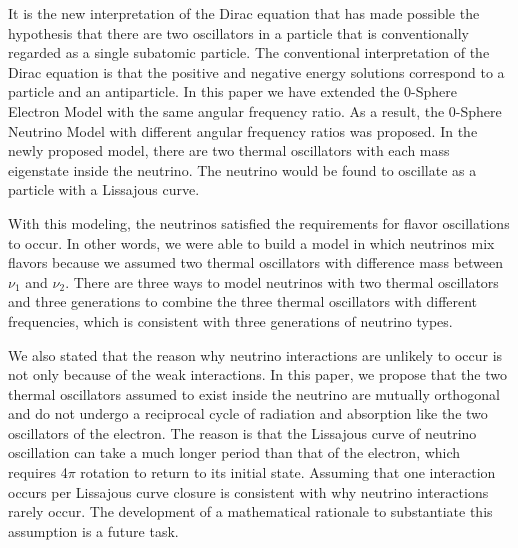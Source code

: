 \documentclass[%
 reprint,
 amsmath,amssymb,
 aps,
]{revtex4-1}
\numberwithin{equation}{section}%
\begin{document}
It is the new interpretation of the Dirac equation that has made possible the hypothesis that there are two oscillators in a particle that is conventionally regarded as a single subatomic particle. The conventional interpretation of the Dirac equation is that the positive and negative energy solutions correspond to a particle and an antiparticle. In this paper we have extended the 0-Sphere Electron Model with the same angular frequency ratio. As a result, the 0-Sphere Neutrino Model with different angular frequency ratios was proposed. In the newly proposed model, there are two thermal oscillators with each mass eigenstate inside the neutrino. The neutrino would be found to oscillate as a particle with a Lissajous curve.




With this modeling, the neutrinos satisfied the requirements for flavor oscillations to occur. In other words, we were able to build a model in which neutrinos mix flavors because we assumed two thermal oscillators with difference mass between $\nu_1$ and $\nu_2$. There are three ways to model neutrinos with two thermal oscillators and three generations to combine the three thermal oscillators with different frequencies, which is consistent with three generations of neutrino types.


We also stated that the reason why neutrino interactions are unlikely to occur is not only because of the weak interactions. In this paper, we propose that the two thermal oscillators assumed to exist inside the neutrino are mutually orthogonal and do not undergo a reciprocal cycle of radiation and absorption like the two oscillators of the electron. The reason is that the Lissajous curve of neutrino oscillation can take a much longer period than that of the electron, which requires 4$\pi$ rotation to return to its initial state. Assuming that one interaction occurs per Lissajous curve closure is consistent with why neutrino interactions rarely occur. The development of a mathematical rationale to substantiate this assumption is a future task.
\end{document}
